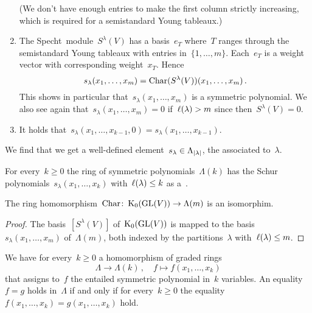 \documentclass[a4paper,10pt]{scrartcl}
\begin{document}
\begin{example}
\begin{enumerate}
      (We don’t have enough entries to make the first column strictly increasing, which is required for a semistandard Young tableaux.)
    \item
      The Specht~module~$S^\lambda(V)$ has a basis~$e_T$ where~$T$ ranges through the semistandard Young tableaux with entries in~$\{1, \dotsc, m\}$.
      Each~$e_T$ is a weight vector with corresponding weight~$x_T$.
      Hence
      \[
        s_\lambda(x_1, \dotsc, x_m)
        =
        \operatorname{Char}(S^\lambda(V))(x_1, \dotsc, x_m) \,.
      \]
      This shows in particular that~$s_\lambda(x_1, \dotsc, x_m)$ is a symmetric polynomial.
      We also see again that~$s_\lambda(x_1, \dotsc, x_m) = 0$ if~$\operatorname{\ell}(\lambda) > m$ since then~$S^\lambda(V) = 0$.
    \item
      It holds that~$s_\lambda(x_1, \dotsc, x_{k-1}, 0) = s_\lambda(x_1, \dotsc, x_{k-1})$.
  \end{enumerate}
  We find that we get a well-defined element~$s_\lambda \in \Lambda_{\lvert\lambda\rvert}$, the  associated to~$\lambda$.
\end{example}

\begin{proposition}
  For every~$k \geq 0$ the ring of symmetric polynomials~$\Lambda(k)$ has the Schur polynomials~$s_\lambda(x_1, \dotsc, x_k)$ with~$\operatorname{\ell}(\lambda) \leq k$ as a~{\basis{$\Integer$}}.
\end{proposition}

\begin{corollary}
  The ring homomorphism~$\operatorname{Char} \colon \operatorname{K}_0(\operatorname{GL}(V)) \to \Lambda(m)$ is an isomorphim.
\end{corollary}

\begin{proof}
  The basis~$[S^\lambda(V)]$ of~$\operatorname{K}_0(\operatorname{GL}(V))$ is mapped to the basis~$s_\lambda(x_1, \dotsc, x_m)$ of~$\Lambda(m)$, both indexed by the partitions~$\lambda$ with~$\operatorname{\ell}(\lambda) \leq m$.
\end{proof}

We have for every~$k \geq 0$ a homomorphism of graded rings
\[
  \Lambda
  \to
  \Lambda(k) \,,
  \quad
  f
  \mapsto
  f(x_1, \dotsc, x_k)
\]
that assigns to~$f$ the entailed symmetric polynomial in~$k$ variables.
An equality~$f = g$ holds in~$\Lambda$ if and only if for every~$k \geq 0$ the equality~$f(x_1, \dotsc, x_k) = g(x_1, \dotsc, x_k)$ hold.

\end{document}
